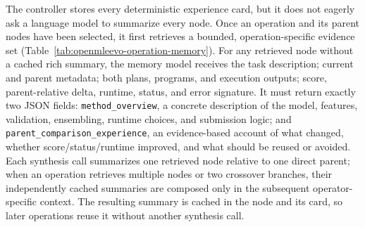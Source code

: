 The controller stores every deterministic experience card, but it does not eagerly ask a language model to summarize every node. Once an operation and its parent nodes have been selected, it first retrieves a bounded, operation-specific evidence set (Table~\ref{tab:openmleevo-operation-memory}). For any retrieved node without a cached rich summary, the memory model receives the task description; current and parent metadata; both plans, programs, and execution outputs; score, parent-relative delta, runtime, status, and error signature. It must return exactly two JSON fields: \nolinkurl{method_overview}, a concrete description of the model, features, validation, ensembling, runtime choices, and submission logic; and \nolinkurl{parent_comparison_experience}, an evidence-based account of what changed, whether score/status/runtime improved, and what should be reused or avoided. Each synthesis call summarizes one retrieved node relative to one direct parent; when an operation retrieves multiple nodes or two crossover branches, their independently cached summaries are composed only in the subsequent operator-specific context. The resulting summary is cached in the node and its card, so later operations reuse it without another synthesis call. 

